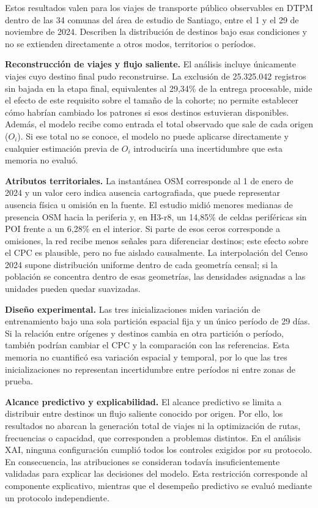 Estos resultados valen para los viajes de transporte público observables en DTPM dentro de las 34 comunas del área de estudio de Santiago, entre el 1 y el 29 de noviembre de 2024. Describen la distribución de destinos bajo esas condiciones y no se extienden directamente a otros modos, territorios o períodos.

\textbf{Reconstrucción de viajes y flujo saliente.} El análisis incluye únicamente viajes cuyo destino final pudo reconstruirse. La exclusión de 25.325.042 registros sin bajada en la etapa final, equivalentes al 29,34\% de la entrega procesable, mide el efecto de este requisito sobre el tamaño de la cohorte; no permite establecer cómo habrían cambiado los patrones si esos destinos estuvieran disponibles. Además, el modelo recibe como entrada el total observado que sale de cada origen ($O_i$). Si ese total no se conoce, el modelo no puede aplicarse directamente y cualquier estimación previa de $O_i$ introduciría una incertidumbre que esta memoria no evaluó.

\textbf{Atributos territoriales.} La instantánea OSM corresponde al 1 de enero de 2024 y un valor cero indica ausencia cartografiada, que puede representar ausencia física u omisión en la fuente. El estudio midió menores medianas de presencia OSM hacia la periferia y, en H3-r8, un 14,85\% de celdas periféricas sin POI frente a un 6,28\% en el interior. Si parte de esos ceros corresponde a omisiones, la red recibe menos señales para diferenciar destinos; este efecto sobre el CPC es plausible, pero no fue aislado causalmente. La interpolación del Censo 2024 supone distribución uniforme dentro de cada geometría censal; si la población se concentra dentro de esas geometrías, las densidades asignadas a las unidades pueden quedar suavizadas.

\textbf{Diseño experimental.} Las tres inicializaciones miden variación de entrenamiento bajo una sola partición espacial fija y un único período de 29 días. Si la relación entre orígenes y destinos cambia en otra partición o período, también podrían cambiar el CPC y la comparación con las referencias. Esta memoria no cuantificó esa variación espacial y temporal, por lo que las tres inicializaciones no representan incertidumbre entre períodos ni entre zonas de prueba.

\textbf{Alcance predictivo y explicabilidad.} El alcance predictivo se limita a distribuir entre destinos un flujo saliente conocido por origen. Por ello, los resultados no abarcan la generación total de viajes ni la optimización de rutas, frecuencias o capacidad, que corresponden a problemas distintos. En el análisis XAI, ninguna configuración cumplió todos los controles exigidos por su protocolo. En consecuencia, las atribuciones se consideran todavía insuficientemente validadas para explicar las decisiones del modelo. Esta restricción corresponde al componente explicativo, mientras que el desempeño predictivo se evaluó mediante un protocolo independiente.


